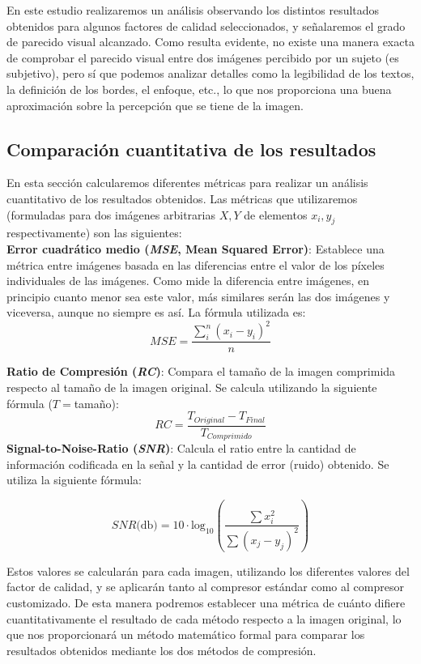 \documentclass[12pt,a4paper]{article}
\begin{document}
En este estudio realizaremos un análisis observando los distintos resultados obtenidos para algunos factores de calidad seleccionados, y señalaremos el grado de parecido visual alcanzado. Como resulta evidente, no existe una manera exacta de comprobar el parecido visual entre dos imágenes percibido por un sujeto (es subjetivo), pero sí que podemos analizar detalles como la legibilidad de los textos, la definición de los bordes, el enfoque, etc., lo que nos proporciona una buena aproximación sobre la percepción que se tiene de la imagen.


\subsection{Comparación cuantitativa de los resultados} \label{metricasCuant}
En esta sección calcularemos diferentes métricas para realizar un análisis cuantitativo de los resultados obtenidos. Las métricas que utilizaremos (formuladas para dos imágenes arbitrarias $X,Y$ de elementos $x_i,y_j$ respectivamente) son las siguientes:\\

\textbf{Error cuadrático medio (\textit{MSE}, Mean Squared Error)}: Establece una métrica entre imágenes basada en las diferencias entre el valor de los píxeles individuales de las imágenes. Como mide la diferencia entre imágenes, en principio cuanto menor sea este valor, más similares serán las dos imágenes y viceversa, aunque no siempre es así. La fórmula utilizada es:
\[
MSE = \frac{\sum_i^n(x_i-y_i)^2}{n}
\]

\textbf{Ratio de Compresión (\textit{RC})}: Compara el tamaño de la imagen comprimida respecto al tamaño de la imagen original. Se calcula utilizando la siguiente fórmula ($T=$tamaño):
\[
RC = \frac{T_{Original}-T_{Final}}{T_{Comprimido}}
\]
\textbf{Signal-to-Noise-Ratio (\textit{SNR})}: Calcula el ratio entre la cantidad de información codificada en la señal y la cantidad de error (ruido) obtenido. Se utiliza la siguiente fórmula:

\[
SNR\text{(db)} = 10\cdot \text{log}_{10} \left( \frac{\sum x_i^2}{\sum(x_j-y_j)^2} \right)
\]

Estos valores se calcularán para cada imagen, utilizando los diferentes valores del factor de calidad, y se aplicarán tanto al compresor estándar como al compresor customizado.  De esta manera podremos establecer una métrica de cuánto difiere cuantitativamente el resultado de cada método respecto a la imagen original, lo que nos proporcionará un método matemático formal para comparar los resultados obtenidos mediante los dos métodos de compresión.\\
\end{document}
